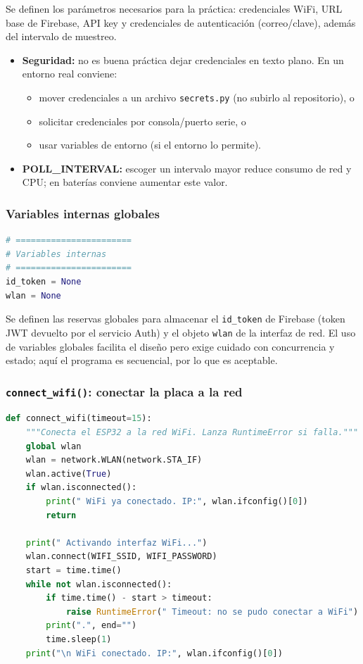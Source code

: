 \documentclass[a4paper,12pt]{article}
\begin{document}
Se definen los parámetros necesarios para la práctica: credenciales WiFi, URL base de Firebase, API key y credenciales de autenticación (correo/clave), además del intervalo de muestreo.

\begin{itemize}
  \item \textbf{Seguridad:} no es buena práctica dejar credenciales en texto plano. En un entorno real conviene:
    \begin{itemize}
      \item mover credenciales a un archivo \texttt{secrets.py} (no subirlo al repositorio), o
      \item solicitar credenciales por consola/puerto serie, o
      \item usar variables de entorno (si el entorno lo permite).
    \end{itemize}
  \item \textbf{POLL\_INTERVAL:} escoger un intervalo mayor reduce consumo de red y CPU; en baterías conviene aumentar este valor.
\end{itemize}

\subsubsection{Variables internas globales}

\begin{lstlisting}[language=Python,caption={Variables internas}]
# =======================
# Variables internas
# =======================
id_token = None
wlan = None
\end{lstlisting}

Se definen las reservas globales para almacenar el \texttt{id\_token} de Firebase (token JWT devuelto por el servicio Auth) y el objeto \texttt{wlan} de la interfaz de red. El uso de variables globales facilita el diseño pero exige cuidado con concurrencia y estado; aquí el programa es secuencial, por lo que es aceptable.

\subsubsection{\texttt{connect\_wifi()}: conectar la placa a la red}

\begin{lstlisting}[language=Python,caption={Función connect\_wifi}]
def connect_wifi(timeout=15):
    """Conecta el ESP32 a la red WiFi. Lanza RuntimeError si falla."""
    global wlan
    wlan = network.WLAN(network.STA_IF)
    wlan.active(True)
    if wlan.isconnected():
        print(" WiFi ya conectado. IP:", wlan.ifconfig()[0])
        return

    print(" Activando interfaz WiFi...")
    wlan.connect(WIFI_SSID, WIFI_PASSWORD)
    start = time.time()
    while not wlan.isconnected():
        if time.time() - start > timeout:
            raise RuntimeError(" Timeout: no se pudo conectar a WiFi")
        print(".", end="")
        time.sleep(1)
    print("\n WiFi conectado. IP:", wlan.ifconfig()[0])
\end{lstlisting}
\end{document}
